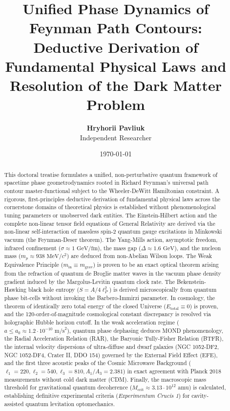 \documentclass[11pt,a4paper]{article}
\title{\textbf{Unified Phase Dynamics of Feynman Path Contours: Deductive Derivation of Fundamental Physical Laws and Resolution of the Dark Matter Problem}}
\author{\textbf{Hryhorii Pavliuk}\\[0.5em]
\small Independent Researcher}
\date{\today}
\theoremstyle{definition}
\begin{document}
\maketitle

\begin{abstract}
This doctoral treatise formulates a unified, non-perturbative quantum framework of spacetime phase geometrodynamics rooted in Richard Feynman's universal path contour master-functional subject to the Wheeler-DeWitt Hamiltonian constraint. A rigorous, first-principles deductive derivation of fundamental physical laws across the cornerstone domains of theoretical physics is established without phenomenological tuning parameters or unobserved dark entities. The Einstein-Hilbert action and the complete non-linear tensor field equations of General Relativity are derived via the non-linear self-interaction of massless spin-2 quantum gauge excitations in Minkowski vacuum (the Feynman-Deser theorem). The Yang-Mills action, asymptotic freedom, infrared confinement ($\sigma \approx 1\text{ GeV/fm}$), the mass gap ($\Delta \approx 1.6\text{ GeV}$), and the nucleon mass ($m_p \approx 938\text{ MeV}/c^2$) are deduced from non-Abelian Wilson loops. The Weak Equivalence Principle ($m_{\text{in}} \equiv m_{\text{grav}}$) is proven to be an exact optical theorem arising from the refraction of quantum de Broglie matter waves in the vacuum phase density gradient induced by the Margolus-Levitin quantum clock rate. The Bekenstein-Hawking black hole entropy ($S = A / 4\ell_P^2$) is derived microscopically from quantum phase bit-cells without invoking the Barbero-Immirzi parameter. In cosmology, the theorem of identically zero total energy of the closed Universe ($E_{\text{total}} \equiv 0$) is proven, and the 120-order-of-magnitude cosmological constant discrepancy is resolved via holographic Hubble horizon cutoff. In the weak acceleration regime ($a \le a_0 \approx 1.2 \cdot 10^{-10}\text{ m/s}^2$), quantum phase dephasing deduces MOND phenomenology, the Radial Acceleration Relation (RAR), the Baryonic Tully-Fisher Relation (BTFR), the internal velocity dispersions of ultra-diffuse and dwarf galaxies (NGC 1052-DF2, NGC 1052-DF4, Crater II, DDO 154) governed by the External Field Effect (EFE), and the first three acoustic peaks of the Cosmic Microwave Background ($\ell_1=220, \ell_2=540, \ell_3=810, A_1/A_3=2.381$) in exact agreement with Planck 2018 measurements without cold dark matter (CDM). Finally, the macroscopic mass threshold for gravitational quantum decoherence ($M_{\text{crit}} \approx 3.13 \cdot 10^{12}\text{ amu}$) is calculated, establishing definitive experimental criteria (\textit{Experimentum Crucis 1}) for cavity-assisted quantum levitation optomechanics.
\end{abstract}
\end{document}
